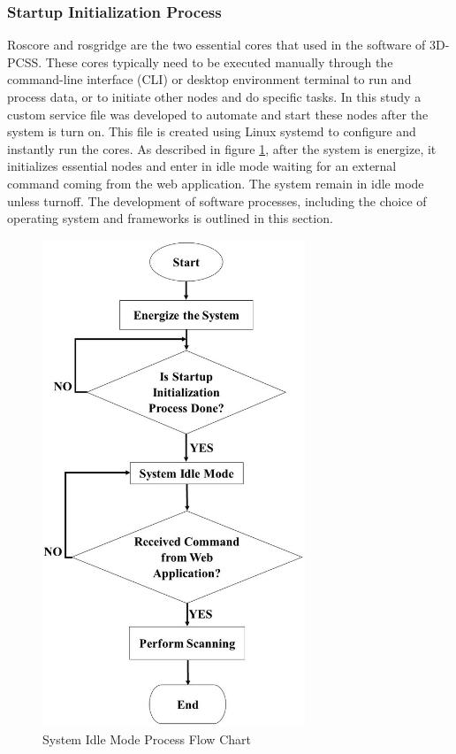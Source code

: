 \subsubsection{Startup Initialization Process}
Roscore and rosgridge are the two essential cores that used in the software of 3D-PCSS. These cores typically need to be executed manually through the command-line interface (CLI) or desktop environment terminal to run and process data, or to initiate other nodes and do specific tasks. In this study a custom service file was developed to automate and start these nodes after the system is turn on. This file is created using Linux systemd to configure and instantly run the cores. As described in figure \ref{ch3:fig:software_system_process}, after the system is energize, it initializes essential nodes and enter in idle mode waiting for an external command coming from the web application. The system remain in idle mode unless turnoff. The development of software processes, including the choice of operating system and frameworks is outlined in this section. \\
\begin{figure}[H]
	\centering
	\includegraphics[width=0.7\textwidth, height=0.7\textheight]{Figures/software_system_process}
	\caption{System Idle Mode Process Flow Chart}
	\label{ch3:fig:software_system_process}
\end{figure}

